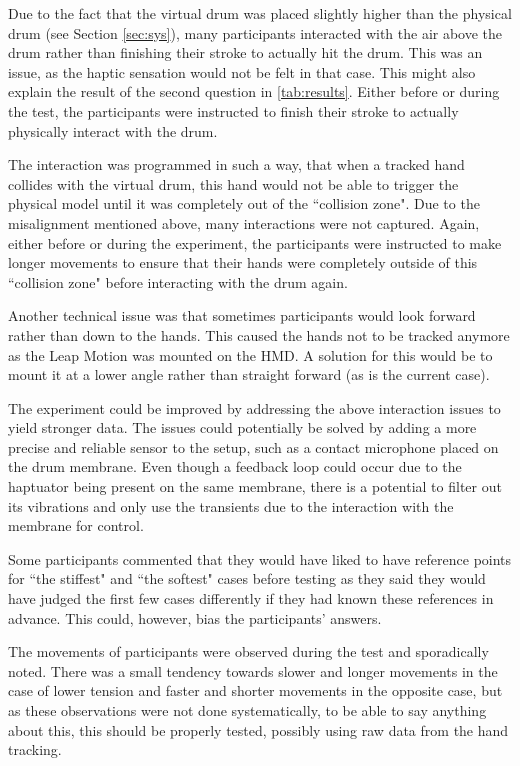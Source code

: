     Due to the fact that the virtual drum was placed slightly higher than the physical drum (see Section \ref{sec:sys}), many participants interacted with the air above the drum rather than finishing their stroke to actually hit the drum. This was an issue, as the haptic sensation would not be felt in that case. This might also explain the result of the second question in \autoref{tab:results}. Either before or during the test, the participants were instructed to finish their stroke to actually physically interact with the drum. 
    
    The interaction was programmed in such a way, that when a tracked hand collides with the virtual drum, this hand would not be able to trigger the physical model until it was  completely out of the ``collision zone". Due to the misalignment mentioned above, many interactions were not captured. Again, either before or during the experiment, the participants were instructed to make longer movements to ensure that their hands were completely outside of this ``collision zone" before interacting with the drum again.
    
    Another technical issue was that sometimes participants would look forward rather than down to the hands. This caused the hands not to be tracked anymore as the Leap Motion was mounted on the HMD. A solution for this would be to mount it at a lower angle rather than straight forward (as is the current case).
    
    The experiment could be improved by addressing the above interaction issues to yield stronger data. The issues could potentially be solved by adding a more precise and reliable sensor to the setup, such as a contact microphone placed on the drum membrane. Even though a feedback loop could occur due to the haptuator being present on the same membrane, there is a potential to filter out its vibrations and only use the transients due to the interaction with the membrane for control.
    
    Some participants commented that they would have liked to have reference points for ``the stiffest" and ``the softest" cases before testing as they said they would have judged the first few cases differently if they had known these references in advance. This could, however, bias the participants' answers.
    
    The movements of participants were observed during the test and sporadically noted. There was a small tendency towards slower and longer movements in the case of lower tension and faster and shorter movements in the opposite case, but as these observations were not done systematically, to be able to say anything about this, this should be properly tested, possibly using raw data from the hand tracking.
    
